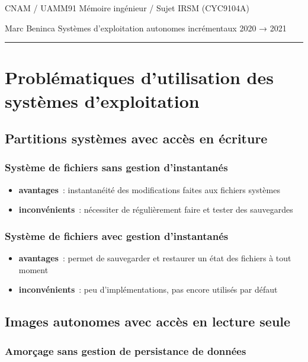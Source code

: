 \documentclass[10pt]{article}
\newcommand{\hr}{\rule{\textwidth}{1pt}}
\newenvironment{itmz}{\begin{itemize}
\setlength{\itemsep}{0em}
}{\end{itemize}}
\begin{document}
CNAM / UAMM91 \hfill Mémoire ingénieur / Sujet \hfill IRSM (CYC9104A)

Marc Beninca \hfill Systèmes d’exploitation autonomes incrémentaux \hfill 2020 → 2021

\hr

\section{Problématiques d’utilisation des systèmes d’exploitation}

\subsection{Partitions systèmes avec accès en écriture}

\subsubsection{Système de fichiers sans gestion d’instantanés}

\begin{itmz}
\item{\textbf{avantages} : instantanéité des modifications faites aux fichiers systèmes}
\item{\textbf{inconvénients} : nécessiter de régulièrement faire et tester des sauvegardes}
\end{itmz}

\subsubsection{Système de fichiers avec gestion d’instantanés}

\begin{itmz}
\item{\textbf{avantages} : permet de sauvegarder et restaurer un état des fichiers à tout moment}
\item{\textbf{inconvénients} : peu d’implémentations, pas encore utilisés par défaut}
\end{itmz}

\subsection{Images autonomes avec accès en lecture seule}

\subsubsection{Amorçage sans gestion de persistance de données}
\end{document}
